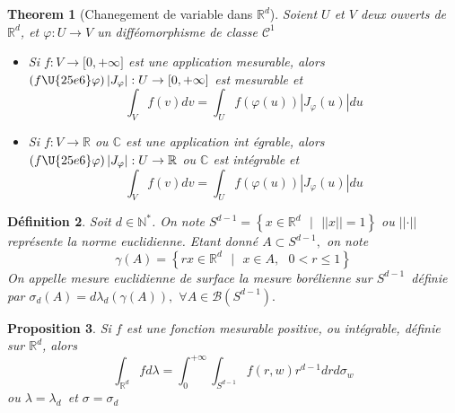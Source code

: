 \documentclass[3pt]{article}
\newtheorem{theorem}{Theorem}
\newtheorem{definition}[theorem]{D\'{e}finition}
\newtheorem{proposition}[theorem]{Proposition}
\begin{document}
\bigskip 

\begin{theorem}[Chanegement de variable dans $\mathbb{R}^{d}$]
Soient $U$ et $V$ deux ouverts de $\mathbb{R}^{d}$, et $\varphi
:U\rightarrow V$ un diff\'{e}omorphisme de classe $\mathcal{C}^{1}$

\begin{itemize}
\item Si $f:V\rightarrow \lbrack 0,+\infty ]$ est une application mesurable,
alors $(f\U{25e6} \varphi )\left\vert J_{\varphi }\right\vert :U\rightarrow
\lbrack 0,+\infty ]$ est mesurable et%
\begin{equation*}
\int_{V}f(v)dv=\int_{U}f(\varphi (u))\left\vert J_{\varphi }(u)\right\vert du
\end{equation*}

\item Si $f:V\rightarrow \mathbb{R}$ ou $\mathbb{C}$ est une application int%
\'{e}grable, alors $(f\U{25e6} \varphi )\left\vert J_{\varphi }\right\vert
:U\rightarrow \mathbb{R}$ ou $\mathbb{C}$ est int\'{e}grable et%
\begin{equation*}
\int_{V}f(v)dv=\int_{U}f(\varphi (u))\left\vert J_{\varphi }(u)\right\vert du
\end{equation*}
\end{itemize}
\end{theorem}

\bigskip 

\begin{definition}
Soit $d\in \mathbb{N}^{\ast }$. On note $S^{d-1}=\left\{ x\in \mathbb{R}^{d}%
\text{ }|\text{\ }\left\vert \left\vert x\right\vert \right\vert =1\right\} $
ou $\left\vert \left\vert \cdot \right\vert \right\vert $ repr\'{e}sente la
norme euclidienne. Etant donn\'{e} $A\subset S^{d-1},$ on note%
\begin{equation*}
\gamma (A)=\left\{ rx\in \mathbb{R}^{d}\text{ }|\text{\ }x\in A,\text{ }%
0<r\leq 1\right\} 
\end{equation*}%
On appelle mesure euclidienne de surface la mesure bor\'{e}lienne sur $%
S^{d-1}$\ d\'{e}finie par $\sigma _{d}(A)=d\lambda _{d}(\gamma (A)),$ $%
\forall A\in \mathcal{B}(S^{d-1}).$
\end{definition}

\bigskip 

\begin{proposition}
Si $f$ est une fonction mesurable positive, ou int\'{e}grable, d\'{e}finie
sur $\mathbb{R}^{d}$, alors%
\begin{equation*}
\int_{\mathbb{R}^{d}}fd\lambda =\int_{0}^{+\infty
}\int_{S^{d-1}}f(r,w)r^{d-1}drd\sigma _{w}
\end{equation*}%
ou $\lambda =\lambda _{d}$\ et $\sigma =\sigma _{d}$
\end{proposition}
\end{document}
